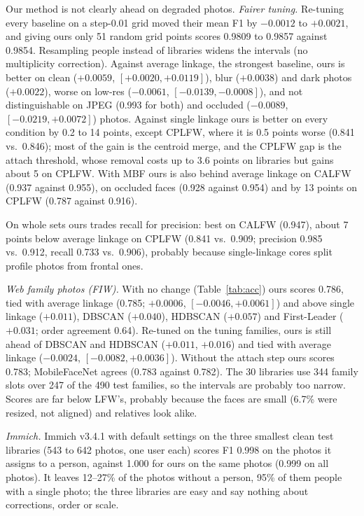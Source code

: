 \documentclass[conference]{IEEEtran}
\begin{document}
Our method is not clearly ahead on degraded photos. \emph{Fairer tuning.} Re-tuning every baseline on a step-0.01 grid
moved their mean F1 by $-0.0012$ to $+0.0021$, and giving ours only 51 random grid points scores 0.9809 to 0.9857 against 0.9854.
Resampling people instead of libraries widens the intervals (no multiplicity correction). Against average linkage, the strongest baseline, ours is better on clean
($+0.0059$, $[+0.0020,+0.0119]$), blur ($+0.0038$) and dark photos ($+0.0022$), worse on low-res ($-0.0061$,
$[-0.0139,-0.0008]$), and not distinguishable on JPEG (0.993 for both) and occluded ($-0.0089$,
$[-0.0219,+0.0072]$) photos. Against single linkage ours is better on every condition by 0.2 to 14 points,
except CPLFW, where it is 0.5 points worse (0.841 vs.\ 0.846); most of the gain is the centroid merge, and the CPLFW gap is the attach threshold, whose removal costs up to
3.6 points on libraries but gains about 5 on CPLFW. With MBF ours is also behind average linkage on CALFW (0.937 against 0.955), on occluded
faces (0.928 against 0.954) and by 13 points on CPLFW (0.787 against 0.916).

On whole sets ours trades recall for precision: best on CALFW (0.947), about 7 points below average linkage on CPLFW (0.841 vs.\
0.909; precision 0.985 vs.\ 0.912, recall 0.733 vs.\ 0.906), probably because single-linkage cores split profile photos from frontal
ones.

\emph{Web family photos (FIW).} With no change (Table~\ref{tab:acc}) ours scores 0.786, tied with average linkage (0.785;
$+0.0006$, $[-0.0046,+0.0061]$) and above single linkage ($+0.011$), DBSCAN ($+0.040$), HDBSCAN ($+0.057$) and
First-Leader ($+0.031$; order agreement 0.64). Re-tuned on the tuning families, ours is still ahead of DBSCAN and HDBSCAN
($+0.011$, $+0.016$) and tied with average linkage ($-0.0024$, $[-0.0082,+0.0036]$). Without the attach step ours scores
0.783; MobileFaceNet agrees (0.783 against 0.782). The 30 libraries use 344 family slots over 247 of the 490 test families, so the intervals are
probably too narrow. Scores are far below LFW's, probably because the faces are small (6.7\% were resized, not aligned) and relatives look alike.

\emph{Immich.} Immich v3.4.1 with default settings on the three smallest clean test libraries (543 to 642 photos, one user each) scores F1 0.998 on the photos it assigns to a person, against 1.000 for ours on the same photos (0.999 on all photos). It leaves 12--27\% of the photos without a person, 95\% of them people with a single photo; the three libraries are easy and say nothing about corrections, order or scale.
\end{document}
